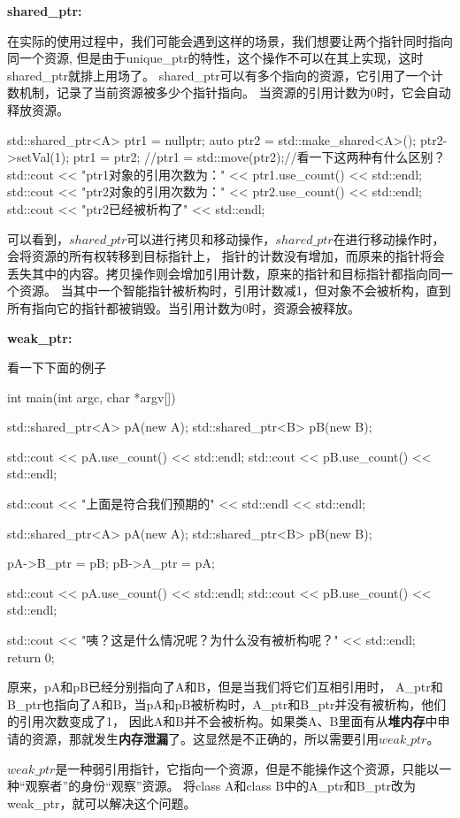 \textbf{shared\_ptr:}

在实际的使用过程中，我们可能会遇到这样的场景，我们想要让两个指针同时指向同一个资源,
但是由于unique\_ptr的特性，这个操作不可以在其上实现，这时shared\_ptr就排上用场了。
shared\_ptr可以有多个指向的资源，它引用了一个计数机制，记录了当前资源被多少个指针指向。
当资源的引用计数为0时，它会自动释放资源。

\begin{tcode}
{
{
    std::shared_ptr<A> ptr1 = nullptr;
    {
        auto ptr2 = std::make_shared<A>();
        ptr2->setVal(1);
        ptr1 = ptr2;
        //ptr1 = std::move(ptr2);//看一下这两种有什么区别？
        std::cout << "ptr1对象的引用次数为：" << ptr1.use_count() << std::endl;
        std::cout << "ptr2对象的引用次数为：" << ptr2.use_count() << std::endl;
    }
    std::cout << "ptr2已经被析构了" << std::endl;
}
}
\end{tcode}
可以看到，$shared\_ptr$可以进行拷贝和移动操作，$shared\_ptr$在进行移动操作时，会将资源的所有权转移到目标指针上，
指针的计数没有增加，而原来的指针将会丢失其中的内容。拷贝操作则会增加引用计数，原来的指针和目标指针都指向同一个资源。
当其中一个智能指针被析构时，引用计数减1，但对象不会被析构，直到所有指向它的指针都被销毁。当引用计数为0时，资源会被释放。

\textbf{weak\_ptr:}

看一下下面的例子

\begin{tcode}
int main(int argc, char *argv[]) {
{
    std::shared_ptr<A> pA(new A);
    std::shared_ptr<B> pB(new B);

    std::cout << pA.use_count() << std::endl;
    std::cout << pB.use_count() << std::endl;
}
std::cout << "上面是符合我们预期的" << std::endl << std::endl;
{
    std::shared_ptr<A> pA(new A);
    std::shared_ptr<B> pB(new B);

    pA->B_ptr = pB;
    pB->A_ptr = pA;

    std::cout << pA.use_count() << std::endl;
    std::cout << pB.use_count() << std::endl;
}
std::cout << "咦？这是什么情况呢？为什么没有被析构呢？" << std::endl;
return 0;
}
\end{tcode}
原来，pA和pB已经分别指向了A和B，但是当我们将它们互相引用时，
A\_ptr和B\_ptr也指向了A和B，当pA和pB被析构时，A\_ptr和B\_ptr并没有被析构，他们的引用次数变成了1，
因此A和B并不会被析构。如果类A、B里面有从\textbf{堆内存}中申请的资源，那就发生\textbf{内存泄漏}了。这显然是不正确的，所以需要引用$weak\_ptr$。

$weak\_ptr$是一种弱引用指针，它指向一个资源，但是不能操作这个资源，只能以一种“观察者”的身份“观察”资源。
将class A和class B中的A\_ptr和B\_ptr改为weak\_ptr，就可以解决这个问题。

